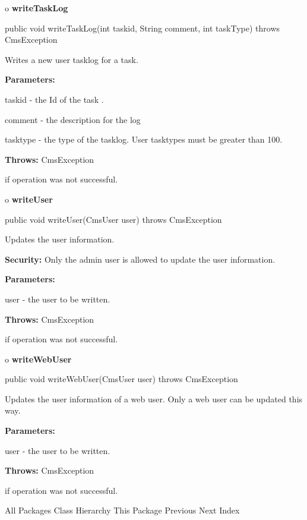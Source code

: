 o {\bf writeTaskLog} 

\begin{PRE}
 public void writeTaskLog(int taskid,
                          String comment,
                          int taskType) throws CmsException
\end{PRE}

\begin{description}
\htmlDD Writes a new user tasklog for a task. 

\begin{description}
\item {\bf Parameters:}  

taskid - the Id of the task .  

comment - the description for the log  

tasktype - the type of the tasklog. User tasktypes must be greater than 100.  
\item {\bf Throws:} CmsException  

if operation was not successful.  
\end{description}

\end{description}

o {\bf writeUser} 

\begin{PRE}
 public void writeUser(CmsUser user) throws CmsException
\end{PRE}

\begin{description}
\htmlDD Updates the user information. 

{\bf Security:} Only the admin user is allowed to update the user information.


\begin{description}
\item {\bf Parameters:}  

user - the user to be written.  
\item {\bf Throws:} CmsException  

if operation was not successful.  
\end{description}

\end{description}

o {\bf writeWebUser} 

\begin{PRE}
 public void writeWebUser(CmsUser user) throws CmsException
\end{PRE}

\begin{description}
\htmlDD Updates the user information of a web user. \htmlBR
Only a web user can be updated this way. 

\begin{description}
\item {\bf Parameters:}  

user - the user to be written.  
\item {\bf Throws:} CmsException  

if operation was not successful.  
\end{description}

\end{description}

\htmlHR

\begin{PRE}
All Packages  Class Hierarchy  This Package  Previous  Next  Index
\end{PRE}

